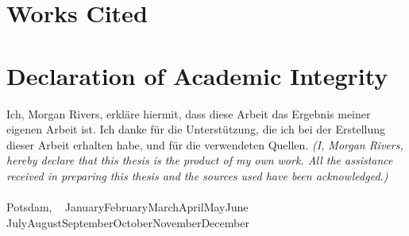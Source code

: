\documentclass[12pt,a4paper]{article}
\newcommand{\MonthName}{%
  \ifcase\month
  \or January\or February\or March\or April\or May\or June%
  \or July\or August\or September\or October\or November\or December%
  \fi
}
\newcommand{\DateDDMonthYYYY}{\number\day~\MonthName~\number\year}
\begin{document}
\clearpage
\section*{Works Cited}
\printbibliography


\clearpage
\section*{Declaration of Academic Integrity}
Ich, Morgan Rivers, erkläre hiermit, dass diese Arbeit das Ergebnis meiner eigenen Arbeit ist. Ich danke für die Unterstützung, die ich bei der Erstellung dieser Arbeit erhalten habe, und für die verwendeten Quellen.
\emph{(I, Morgan Rivers, hereby declare that this thesis is the product of my own work. All the assistance received in preparing this thesis and the sources used have been acknowledged.)} \\
\\
Potsdam, \DateDDMonthYYYY

\end{document}
